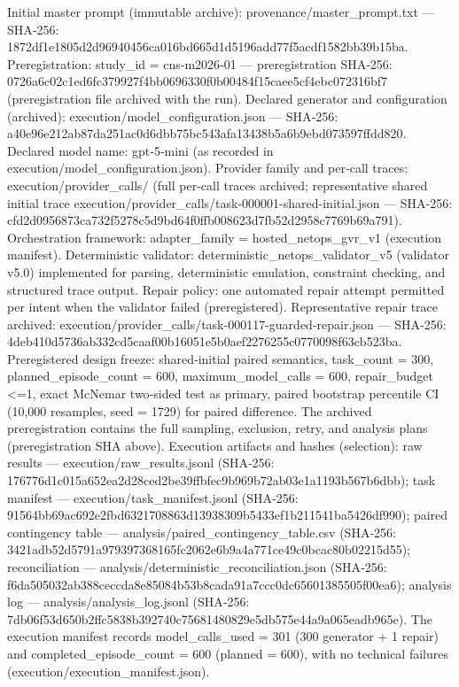 \documentclass[conference]{IEEEtran}
\begin{document}
Initial master prompt (immutable archive): provenance/master\_prompt.txt --- SHA‑256: 1872df1e1805d2d96940456ca016bd665d1d5196add77f5acdf1582bb39b15ba.
Preregistration: study\_id = cns‑m2026‑01 --- preregistration SHA‑256: 0726a6c02c1ed6fc379927f4bb0696330f0b00484f15caee5cf4ebc072316bf7 (preregistration file archived with the run). 
Declared generator and configuration (archived): execution/model\_configuration.json --- SHA‑256: a40e96e212ab87da251ac0d6dbb75bc543afa13438b5a6b9ebd073597ffdd820. Declared model name: gpt‑5‑mini (as recorded in execution/model\_configuration.json). Provider family and per‑call traces: execution/provider\_calls/ (full per‑call traces archived; representative shared initial trace execution/provider\_calls/task-000001-shared-initial.json --- SHA‑256: cfd2d0956873ca732f5278c5d9bd64f0ffb008623d7fb52d2958c7769b69a791). 
Orchestration framework: adapter\_family = hosted\_netops\_gvr\_v1 (execution manifest). Deterministic validator: deterministic\_netops\_validator\_v5 (validator v5.0) implemented for parsing, deterministic emulation, constraint checking, and structured trace output. Repair policy: one automated repair attempt permitted per intent when the validator failed (preregistered). Representative repair trace archived: execution/provider\_calls/task-000117-guarded-repair.json --- SHA‑256: 4deb410d5736ab332cd5caaf00b16051e5b0aef2276255c0770098f63cb523ba.
Preregistered design freeze: shared‑initial paired semantics, task\_count = 300, planned\_episode\_count = 600, maximum\_model\_calls = 600, repair\_budget <=1, exact McNemar two‑sided test as primary, paired bootstrap percentile CI (10,000 resamples, seed = 1729) for paired difference. The archived preregistration contains the full sampling, exclusion, retry, and analysis plans (preregistration SHA above).
Execution artifacts and hashes (selection): raw results --- execution/raw\_results.jsonl (SHA‑256: 176776d1c015a652ea2d28ced2be39ffbfec9b969b72ab03e1a1193b567b6dbb); task manifest --- execution/task\_manifest.jsonl (SHA‑256: 91564bb69ac692e2fbd6321708863d13938309b5433ef1b211541ba5426df990); paired contingency table --- analysis/paired\_contingency\_table.csv (SHA‑256: 3421adb52d5791a979397368165fc2062e6b9a4a771ce49c0bcac80b02215d55); reconciliation --- analysis/deterministic\_reconciliation.json (SHA‑256: f6da505032ab388ceccda8e85084b53b8cada91a7ccc0dc65601385505f00ea6); analysis log --- analysis/analysis\_log.jsonl (SHA‑256: 7db06f53d650b2ffc5838b392740c75681480829e5db575e44a9a065eadb965e). The execution manifest records model\_calls\_used = 301 (300 generator + 1 repair) and completed\_episode\_count = 600 (planned = 600), with no technical failures (execution/execution\_manifest.json). 
\end{document}
